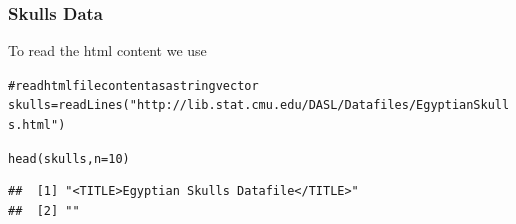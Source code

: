 \documentclass{beamer}\usepackage[]{graphicx}\usepackage[]{color}
\makeatletter
\newcommand{\hlnum}[1]{\textcolor[rgb]{0.063,0.58,0.627}{#1}}%
\newcommand{\hlstr}[1]{\textcolor[rgb]{0.063,0.58,0.627}{#1}}%
\newcommand{\hlcom}[1]{\textcolor[rgb]{0.588,0.588,0.588}{#1}}%
\newcommand{\hlstd}[1]{\textcolor[rgb]{0.196,0.196,0.196}{#1}}%
\newcommand{\hlkwb}[1]{\textcolor[rgb]{0.627,0,0.314}{#1}}%
\newcommand{\hlkwc}[1]{\textcolor[rgb]{0,0.631,0.314}{#1}}%
\newcommand{\hlkwd}[1]{\textcolor[rgb]{0.78,0.227,0.412}{#1}}%
\newenvironment{kframe}{%
 \def\at@end@of@kframe{}%
 \ifinner\ifhmode%
  \def\at@end@of@kframe{\end{minipage}}%
  \begin{minipage}{\columnwidth}%
 \fi\fi%
 \def\FrameCommand##1{\hskip\@totalleftmargin \hskip-\fboxsep
 \colorbox{shadecolor}{##1}\hskip-\fboxsep
     \hskip-\linewidth \hskip-\@totalleftmargin \hskip\columnwidth}%
 \MakeFramed {\advance\hsize-\width
   \@totalleftmargin\z@ \linewidth\hsize
   \@setminipage}}%
 {\par\unskip\endMakeFramed%
 \at@end@of@kframe}
\newenvironment{knitrout}{}{} %
\makeatother
\begin{document}
\begin{frame}[fragile]
\frametitle{Skulls Data}

To read the html content we use 

\begin{knitrout}\tiny
{}\color{fgcolor}\begin{kframe}
\begin{alltt}
\hlcom{# read html file content as a string vector}
\hlstd{skulls} \hlkwb{=} \hlkwd{readLines}\hlstd{(}\hlstr{"http://lib.stat.cmu.edu/DASL/Datafiles/EgyptianSkulls.html"}\hlstd{)}
\end{alltt}
\end{kframe}
\end{knitrout}

\begin{knitrout}\tiny
{}\color{fgcolor}\begin{kframe}
\begin{alltt}
\hlkwd{head}\hlstd{(skulls,} \hlkwc{n} \hlstd{=} \hlnum{10}\hlstd{)}
\end{alltt}
\begin{verbatim}
##  [1] "<TITLE>Egyptian Skulls Datafile</TITLE>"                                                                                                                                                                                                                                                                                                                                                                                                                                                                                                                                                                                                                                                                                       
##  [2] ""                                                                                                                                                                                                                                                                                                                                                                                                                                                                                                                                                                                                                                                                                                                              

\end{verbatim}
\end{kframe}
\end{knitrout}
\end{frame}
\end{document}
